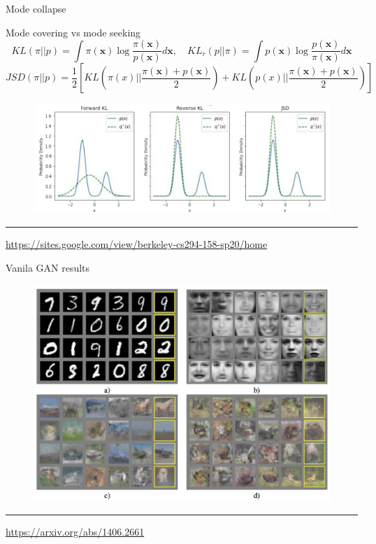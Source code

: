 \documentclass{beamer}
\newcommand{\bx}{\mathbf{x}}
\begin{document}
\begin{frame}{Mode collapse}
	\begin{block}{Mode covering vs mode seeking}
		\vspace{-0.2cm}
		\[
			KL(\pi || p) = \int \pi(\bx) \log \frac{\pi(\bx)}{p(\bx)}d\bx, \quad KL_r(p || \pi) = \int p(\bx) \log \frac{p(\bx)}{\pi(\bx)}d\bx
		\]
		\[
		JSD(\pi || p) = \frac{1}{2} \left[KL \left(\pi(x) || \frac{\pi(\bx) + p(\bx)}{2}\right) + KL \left(p(x) || \frac{\pi(\bx) + p(\bx)}{2}\right) \right]
		\]
		\vspace{-0.4cm}
		\begin{figure}
			\centering
			\includegraphics[width=0.7\linewidth]{figs/mode_collapse_2}
		\end{figure}
	\vspace{-0.3cm}
	\end{block}
	\vfill
	\hrule\medskip
	{\scriptsize \href{https://sites.google.com/view/berkeley-cs294-158-sp20/home}{https://sites.google.com/view/berkeley-cs294-158-sp20/home}}
\end{frame}
\begin{frame}{Vanila GAN results}
	\begin{figure}
		\centering
		\includegraphics[width=0.95\linewidth]{figs/vanila_gan_results}
	\end{figure}
	\vfill
	\hrule\medskip
	{\scriptsize \href{https://arxiv.org/abs/1406.2661}{https://arxiv.org/abs/1406.2661}}
\end{frame}
\end{document}
